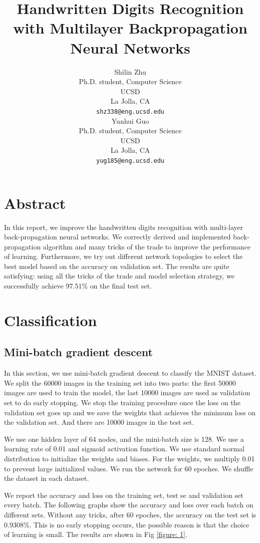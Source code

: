 \documentclass{article} %
\title{Handwritten Digits Recognition with Multilayer Backpropagation Neural Networks}
\author{
Shilin Zhu \\
Ph.D. student, Computer Science\\
UCSD\\
La Jolla, CA \\
\texttt{shz338@eng.ucsd.edu} \\
\And
Yunhui Guo\\
Ph.D. student, Computer Science\\
UCSD\\
La Jolla, CA \\
\texttt{yug185@eng.ucsd.edu} \\
}
\begin{document}
\maketitle
\section{Abstract}
In this report, we improve the handwritten digits recognition with multi-layer back-propagation neural networks. We correctly derived and implemented back-propagation algorithm and many tricks of the trade to improve the performance of learning. Furthermore, we try out different network topologies to select the best model based on the accuracy on validation set. The results are quite satisfying: using all the tricks of the trade and model selection strategy, we successfully achieve $97.51\%$ on the final test set.

\section{Classification}
\subsection{Mini-batch gradient descent}
In this section, we use mini-batch gradient descent to classify the MNIST dataset. We split the 60000 images in the training set into two parts: the first 50000 images are used to train the model, the last 10000 images are used as validation set to do early stopping. We stop the training procedure once the loss on the validation set goes up and we save the weights that achieves the minimum loss on the validation set. And there are 10000 images in the test set.

We use one hidden layer of 64 nodes, and the mini-batch size is 128. We use a learning rate of 0.01 and sigmoid activation function. We use standard normal distribution to initialize the weights and biases. For the weights, we multiply 0.01 to prevent large initialized values. We run the network for 60 epoches. We shuffle the dataset in each dataset.

We report the accuracy and loss on the training set, test se and validation set every batch. The following graphs show the accuracy and loss over each batch on different sets. Without any tricks, after 60 epoches, the accuracy on the test set is 0.9308\%. This is no early stopping occurs, the possible reason is that the choice of learning is small. The results are shown in Fig \ref{figure: 1}.
\end{document}
